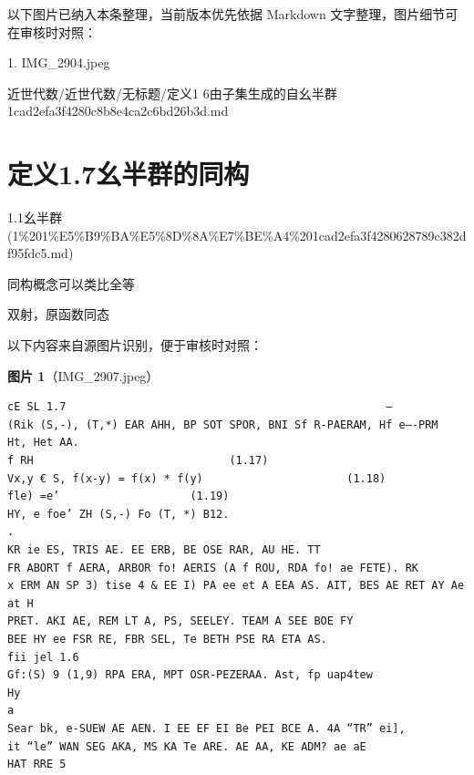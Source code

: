 \begin{note}[关联图片]
以下图片已纳入本条整理，当前版本优先依据 Markdown 文字整理，图片细节可在审核时对照：

1. IMG\_2904.jpeg\\

\end{note}

\begin{note}[来源路径]

近世代数/近世代数/无标题/定义1 6由子集生成的自幺半群 1cad2efa3f4280c8b8e4ca2c6bd26b3d.md

\end{note}

\section*{定义1.7幺半群的同构}

\begin{note}[来源上级主题]

1.1幺半群 (1\%201\%E5\%B9\%BA\%E5\%8D\%8A\%E7\%BE\%A4\%201cad2efa3f4280628789c382df95fdc5.md)

\end{note}

\begin{definition}[定义1.7幺半群的同构]

同构概念可以类比全等

双射，原函数同态

\end{definition}

\begin{note}
以下内容来自源图片识别，便于审核时对照：

\textbf{图片 1}（IMG\_2907.jpeg）
\begin{Verbatim}[fontsize=\small]
cE SL 1.7                                                 —
(Rik (S,-), (T,*) EAR AHH, BP SOT SPOR, BNI Sf R-PAERAM, Hf e—-PRM
Ht, Het AA.
f RH                              (1.17)
Vx,y € S, f(x-y) = f(x) * f(y)                      (1.18)
fle) =e’                    (1.19)
HY, e foe’ ZH (S,-) Fo (T, *) B12.                                                                   .
KR ie ES, TRIS AE. EE ERB, BE OSE RAR, AU HE. TT
FR ABORT f AERA, ARBOR fo! AERIS (A f ROU, RDA fo! ae FETE). RK
x ERM AN SP 3) tise 4 & EE I) PA ee et A EEA AS. AIT, BES AE RET AY Ae at H
PRET. AKI AE, REM LT A, PS, SEELEY. TEAM A SEE BOE FY
BEE HY ee FSR RE, FBR SEL, Te BETH PSE RA ETA AS.
fii jel 1.6
Gf:(S) 9 (1,9) RPA ERA, MPT OSR-PEZERAA. Ast, fp uap4tew
Hy
a
Sear bk, e-SUEW AE AEN. I EE EF EI Be PEI BCE A. 4A “TR” ei],
it “le” WAN SEG AKA, MS KA Te ARE. AE AA, KE ADM? ae aE
HAT RRE 5
\end{Verbatim}

\end{note}

